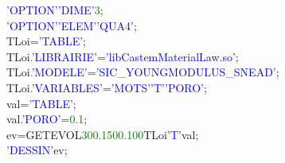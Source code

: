 \noindent
\textcolor{blue}{'OPTION'}\hspace*{1em}\textcolor{blue}{'DIME'}\hspace*{1em}\textcolor{green}{3};\\
\textcolor{blue}{'OPTION'}\hspace*{1em}\textcolor{blue}{'ELEM'}\hspace*{1em}\textcolor{blue}{'QUA4'};\\
\newline
TLoi\hspace*{1em}=\hspace*{1em}\textcolor{blue}{'TABLE'};\\
TLoi\textcolor{green}{.}\textcolor{blue}{'LIBRAIRIE'}\hspace*{1em}=\hspace*{1em}\textcolor{blue}{'libCastemMaterialLaw.so'};\\
TLoi\textcolor{green}{.}\textcolor{blue}{'MODELE'}\hspace*{1em}\hspace*{1em}\hspace*{1em}\hspace*{1em}=\hspace*{1em}\textcolor{blue}{'SIC\_YOUNGMODULUS\_SNEAD'};\\
TLoi\textcolor{green}{.}\textcolor{blue}{'VARIABLES'}\hspace*{1em}=\hspace*{1em}\textcolor{blue}{'MOTS'}\hspace*{1em}\textcolor{blue}{'T'}\hspace*{1em}\textcolor{blue}{'PORO'};\\
\newline
val\hspace*{1em}=\hspace*{1em}\textcolor{blue}{'TABLE'};\\
val\textcolor{green}{.}\textcolor{blue}{'PORO'}\hspace*{1em}=\hspace*{1em}\textcolor{green}{0.1};\\
\newline
ev\hspace*{1em}=\hspace*{1em}GETEVOL\hspace*{1em}\textcolor{green}{300.}\hspace*{1em}\textcolor{green}{1500.}\hspace*{1em}\textcolor{green}{100}\hspace*{1em}TLoi\hspace*{1em}\textcolor{blue}{'T'}\hspace*{1em}val;\\
\textcolor{blue}{'DESSIN'}\hspace*{1em}ev;
